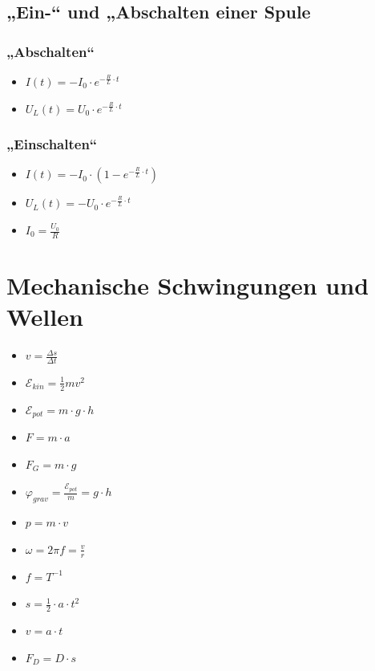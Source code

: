 \documentclass[paper = a4, twocolumn]{scrartcl}
\DeclareRobustCommand{\E}{\mathcal{E}}
\begin{document}
\subsection{„Ein-“ und „Abschalten einer Spule}
\subsubsection{„Abschalten“}
\begin{itemize}
\item
	\( I(t) = -I_0 \cdot e^{-\frac{R}{L} \cdot t} \)
\item
	\( U_L(t) = U_0 \cdot e^{-\frac{R}{L} \cdot t} \)
\end{itemize}

\subsubsection{„Einschalten“}
\begin{itemize}
\item
	\( I(t) = -I_0 \cdot (1 - e^{-\frac{R}{L} \cdot t} ) \)
\item
	\( U_L(t) = -U_0 \cdot e^{-\frac{R}{L} \cdot t} \)
\item
	\( I_0 = \frac{U_0}{R} \)
\end{itemize}

\section{Mechanische Schwingungen und Wellen}
\begin{itemize}
\item
	\( v = \frac{\Delta s}{\Delta t} \)
\item
	\( \E_{kin} = \frac{1}{2} m v^2 \)
\item
	\( \E_{pot} = m \cdot g \cdot h \)
\item
	\( F = m \cdot a \)
\item
	\( F_G = m \cdot g \)
\item
	\( \varphi_{grav} = \frac{\E_{pot}}{m} = g \cdot h \)
\item
	\( p = m \cdot v \)
\item
	\( \omega = 2 \pi f = \frac{v}{r} \)
\item
	\( f = T^{-1} \)
\item
	\( s = \frac{1}{2} \cdot a \cdot t^2 \)
\item
	\( v = a \cdot t \)
\item
	\( F_D = D \cdot s \)
\end{itemize}
\end{document}
